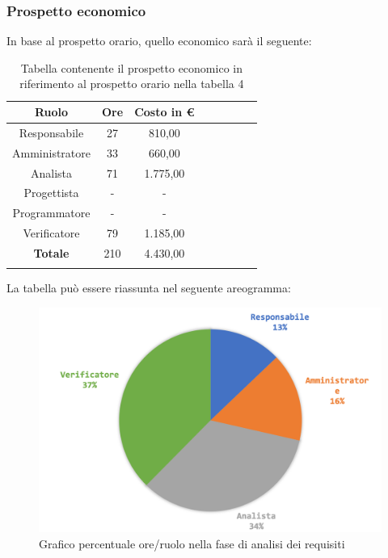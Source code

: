 			\subsubsection{Prospetto economico}
			In base al prospetto orario, quello economico sarà il seguente: 
			
			\begin{longtable}{|c|c|c|c|c|c|c|c|}
				\hline
				\rowcolor{lighter-grayer}
				\textbf{Ruolo} & \textbf{Ore} & \textbf{Costo in €} \\
				\hline
				\endfirsthead
				
				\hline
				Responsabile & 27 & 810,00\\
				\hline
				\hline
				Amministratore & 33 & 660,00\\
				\hline
				\hline
				Analista & 71 & 1.775,00\\
				\hline
				\hline
				Progettista & - & -\\
				\hline
				\hline
				Programmatore & - & -\\
				\hline
				\hline
				Verificatore & 79 & 1.185,00\\
				\hline
				\textbf{Totale} & 210 & 4.430,00\\
				\hline
				\caption{Tabella contenente il prospetto economico in riferimento al prospetto orario nella tabella 4}
			\end{longtable}
			\pagebreak
		
			La tabella può essere riassunta nel seguente areogramma:
			\begin{figure}[H]
				\centering
				\includegraphics[width=0.8\linewidth]{./images/preventivo/analisi2.png}
				\caption{Grafico percentuale ore/ruolo nella fase di analisi dei requisiti}
				\label{fig:grafico costi ruolo fase analisi dei requisiti}
			\end{figure}
		
